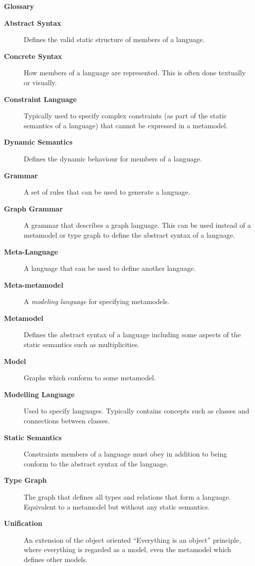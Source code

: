 \newpage
{}
{}

\vspace{1cm}
{\Huge \bf Glossary}
\vspace{1cm}


\begin{description}

\item[\bf Abstract Syntax] 
Defines the valid static structure of members of a language. 

\item[\bf Concrete Syntax]
How members of a language are represented. This is often done textually or visually.

\item[\bf Constraint Language] 
Typically used to specify complex constraints (as part of the static semantics of a language) that cannot be expressed in a metamodel.

\item[\bf Dynamic Semantics] 
Defines the dynamic behaviour for members of a language.

\item[\bf Grammar] 
A set of rules that can be used to generate a language. 

\item[\bf Graph Grammar] 
A grammar that describes a graph language. This can be used instead of a metamodel or type graph to define the abstract syntax of a language.

\item[\bf Meta-Language] 
A language that can be used to define another language.

\item[\bf Meta-metamodel] 
A \emph{modeling language} for specifying metamodels.

\item[\bf Metamodel] 
Defines the abstract syntax of a language including some aspects of the static semantics such as multiplicities. 

\item[\bf Model] 
Graphs which conform to some metamodel.

\item[\bf Modelling Language] 
Used to specify languages. Typically contains concepts such as classes and connections between classes.

\item[\bf Static Semantics] 
Constraints members of a language must obey in addition to being conform to the abstract syntax of the language.

\item[\bf Type Graph] 
The graph that defines all types and relations that form a language. Equivalent to a metamodel but without any static semantics.

\item[\bf Unification]  
An extension of the object oriented ``Everything is an object'' principle, where everything is regarded as a model, even the metamodel which defines other
models.

\end{description}
